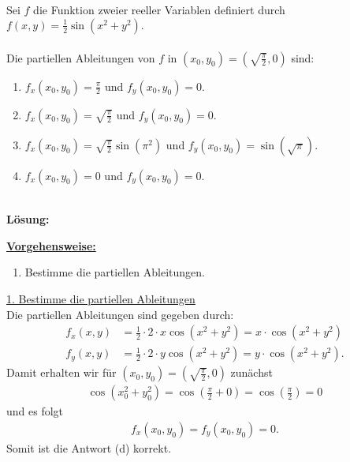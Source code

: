 \newpage

\subsection*{}
Sei $f$ die Funktion zweier reeller Variablen definiert durch $f(x,y) = \frac{1}{2} \sin(x^2 +y^2).$\\
\\
Die partiellen Ableitungen von $f$ in $(x_0, y_0) = \left(\sqrt{\frac{\pi}{2}}, 0 \right)$ sind:
\renewcommand{\labelenumi}{(\alph{enumi})}
\begin{enumerate}
	\item 
	$f_x(x_0,y_0) = \frac{\pi}{2}$ und $f_y(x_0,y_0) = 0$.
	\item
	$f_x(x_0,y_0) =  \sqrt{\frac{\pi}{2}} $ und $f_y(x_0,y_0) = 0$.
	\item
	$f_x(x_0,y_0) = \sqrt{\frac{\pi}{2}} \sin(\pi^2) $ und $f_y(x_0,y_0) = \sin(\sqrt{\pi})$.
	\item
	$f_x(x_0,y_0) = 0 $ und $f_y(x_0,y_0) = 0$.
\end{enumerate}
\ \\
\textbf{Lösung:}
\begin{mdframed}
\underline{\textbf{Vorgehensweise:}}
\renewcommand{\labelenumi}{\theenumi.}
\begin{enumerate}
\item Bestimme die partiellen Ableitungen.
\end{enumerate}
\end{mdframed}

\underline{1. Bestimme die partiellen Ableitungen}\\
Die partiellen Ableitungen sind gegeben durch:
\begin{align*}
	f_x(x,y)
	&=
	\frac{1}{2} \cdot 2 \cdot x \cos(x^2 + y^2)
	=
	x \cdot \cos(x^2 + y^2)\\
	f_y(x,y)
	&=
	\frac{1}{2} \cdot 2 \cdot y \cos(x^2 + y^2)
	=
	y \cdot \cos(x^2 + y^2)
	.
\end{align*}
Damit erhalten wir für $(x_0,y_0) = \left(\sqrt{\frac{\pi}{2}}, 0 \right)$ zunächst
\begin{align*}
	\cos(x_0^2 + y_0^2)
	=
	\cos\left( \frac{ \pi}{2} + 0\right)
	=
	\cos \left( \frac{ \pi}{2} \right) = 0
\end{align*}
und es folgt
\begin{align*}
	f_x(x_0,y_0) = f_y(x_0,y_0) = 0.
\end{align*}
Somit ist die Antwort (d) korrekt.

